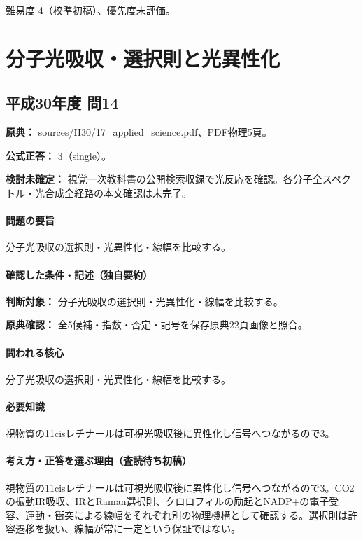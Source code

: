 \par 難易度 4（校準初稿）、優先度未評価。

\section{分子光吸収・選択則と光異性化}

\subsection{平成30年度 問14}
\label{q:h30-reg-applied-14}

\noindent\textbf{原典：} sources/H30/17\_applied\_science.pdf、PDF物理5頁。

\textbf{公式正答：} 3（single）。

\par\textbf{検討未確定：} 視覚一次教科書の公開検索収録で光反応を確認。各分子全スペクトル・光合成全経路の本文確認は未完了。

\paragraph{問題の要旨} 分子光吸収の選択則・光異性化・線幅を比較する。

\paragraph{確認した条件・記述（独自要約）}\mbox{}\par

\noindent\textbf{判断対象：} 分子光吸収の選択則・光異性化・線幅を比較する。\par

\noindent\textbf{原典確認：} 全5候補・指数・否定・記号を保存原典22頁画像と照合。\par

\paragraph{問われる核心} 分子光吸収の選択則・光異性化・線幅を比較する。

\paragraph{必要知識} 視物質の11cisレチナールは可視光吸収後に異性化し信号へつながるので3。

\paragraph{考え方・正答を選ぶ理由（査読待ち初稿）} 視物質の11cisレチナールは可視光吸収後に異性化し信号へつながるので3。CO2の振動IR吸収、IRとRaman選択則、クロロフィルの励起とNADP+の電子受容、運動・衝突による線幅をそれぞれ別の物理機構として確認する。選択則は許容遷移を扱い、線幅が常に一定という保証ではない。

